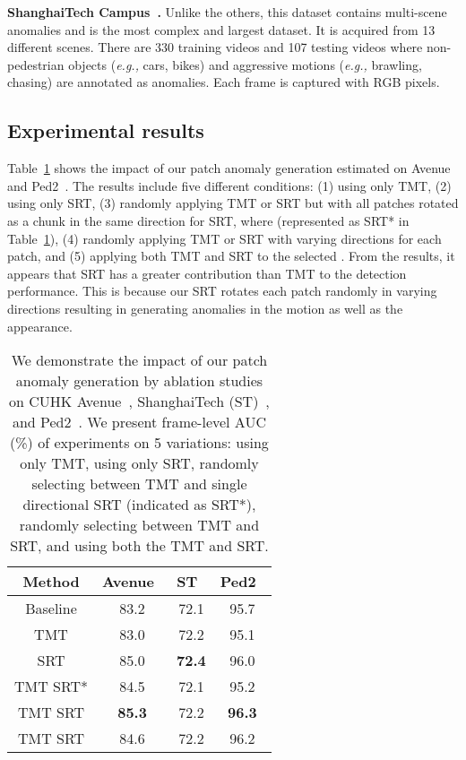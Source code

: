 \documentclass[10pt,twocolumn,letterpaper]{article}
\begin{document}
\vspace{0.2em}
{\noindent \bf ShanghaiTech Campus~\cite{luo2017revisit}.}
Unlike the others, this dataset contains multi-scene anomalies and is the most complex and largest dataset. It is acquired from 13 different scenes. There are 330 training videos and 107 testing videos where non-pedestrian objects ({\it e.g.,} cars, bikes) and aggressive motions ({\it e.g.,} brawling, chasing) are annotated as anomalies. Each frame is captured with  RGB pixels. 

\subsection{Experimental results}
\label{section4}
Table~\ref{augmentationAblation} shows the impact of our patch anomaly generation estimated on Avenue~\cite{lu2013abnormal} and Ped2~\cite{mahadevan2010anomaly}. The results include five different conditions: (1) using only TMT, (2) using only SRT, (3) randomly applying TMT or SRT but with all patches rotated as a chunk in the same direction for SRT, where  (represented as SRT* in Table~\ref{augmentationAblation}), (4) randomly applying TMT or SRT with varying directions for each patch, and (5) applying both TMT and SRT to the selected . From the results, it appears that SRT has a greater contribution than TMT to the detection performance. This is because our SRT rotates each patch randomly in varying directions resulting in generating anomalies in the motion as well as the appearance. 

\begin{table}
	\centering
	\begin{adjustbox}{width=0.8\linewidth}
		\begin{tabular}{ c|c|c|c } 
			\hline
			Method & Avenue~\cite{lu2013abnormal} & ST~\cite{luo2017revisit} & Ped2~\cite{mahadevan2010anomaly} \\
			\hline\hline
			Baseline & 83.2 & 72.1 & 95.7 \\
			TMT &  83.0  &  72.2  &  95.1  \\ 
			SRT &  85.0  & \textbf{72.4} & 96.0 \\ 
			TMT  SRT* &  84.5  &  72.1  &  95.2  \\ 
			TMT  SRT& \textbf{85.3} &  72.2  & \textbf{96.3} \\
			TMT  SRT&  84.6  &  72.2  &  96.2  \\
			\hline
		\end{tabular}
	\end{adjustbox} 
	\vspace{0.3cm}
	\caption{We demonstrate the impact of our patch anomaly generation by ablation studies on CUHK Avenue~\cite{lu2013abnormal}, ShanghaiTech (ST)~\cite{luo2017revisit}, and Ped2~\cite{mahadevan2010anomaly}. We present frame-level AUC (\%) of experiments on 5 variations: using only TMT, using only SRT, randomly selecting between TMT and single directional SRT (indicated as SRT*), randomly selecting between TMT and SRT, and using both the TMT and SRT.}
	\label{augmentationAblation}
\end{table}
\vspace{0.3em}
\end{document}
